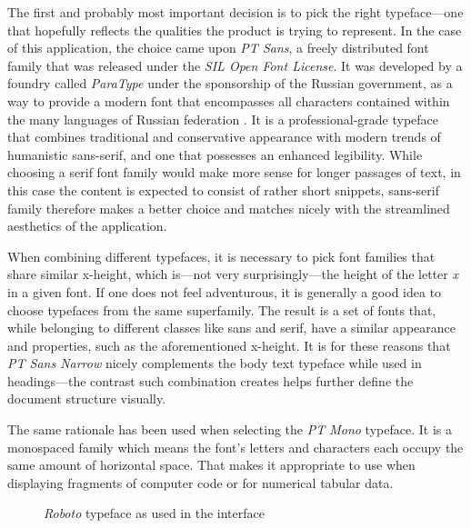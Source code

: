 \documentclass[thesis=M,english,hidelinks]{FITthesis}[2012/10/20]
\begin{document}
The first and probably most important decision is to pick the right typeface---one that hopefully reflects the qualities the product is trying to represent. In the case of this application, the choice came upon \textit{PT Sans}, a freely distributed font family that was released under the \textit{SIL Open Font License}. It was developed by a foundry called \textit{ParaType} under the sponsorship of the Russian government, as a way to provide a modern font that encompasses all characters contained within the many languages of Russian federation \cite{paratype}. It is a professional-grade typeface that combines traditional and conservative appearance with modern trends of humanistic sans-serif, and one that possesses an enhanced legibility. While choosing a serif font family would make more sense for longer passages of text, in this case the content is expected to consist of rather short snippets, sans-serif family therefore makes a better choice and matches nicely with the streamlined aesthetics of the application.

When combining different typefaces, it is necessary to pick font families that share similar x-height, which is---not very surprisingly---the height of the letter \textit{x} in a given font. If one does not feel adventurous, it is generally a good idea to choose typefaces from the same superfamily. The result is a set of fonts that, while belonging to different classes like sans and serif, have a similar appearance and properties, such as the aforementioned x-height. It is for these reasons that \textit{PT Sans Narrow} nicely complements the body text typeface while used in headings---the contrast such combination creates helps further define the document structure visually.

The same rationale has been used when selecting the \textit{PT Mono} typeface. It is a monospaced family which means the font's letters and characters each occupy the same amount of horizontal space. That makes it appropriate to use when displaying fragments of computer code or for numerical tabular data.

\begin{figure}
  \centering
  \setlength\fboxsep{0pt}
  \setlength\fboxrule{0.2pt}
  \caption{\textit{Roboto} typeface as used in the interface}
  \label{fig:roboto}
\end{figure}
\end{document}
